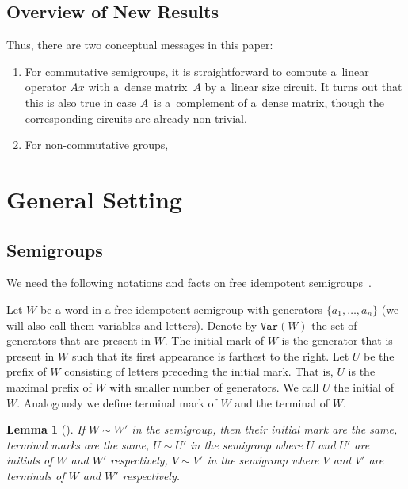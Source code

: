 \documentclass[11pt,letterpaper]{article}
\newtheorem{lemma}{Lemma}
\newcommand{\var}{\texttt{Var}}
\begin{document}
\subsection{Overview of New Results}

Thus, there are two conceptual messages in this paper:
\begin{enumerate}
\item For commutative semigroups, it is straightforward to compute a~linear operator $Ax$ with a~dense matrix~$A$ by a~linear size circuit. It turns out that this is also true in case $A$~is a~complement of a~dense matrix, though the corresponding circuits are already non-trivial.
\item For non-commutative groups,
\end{enumerate}

\section{General Setting}
\subsection{Semigroups}

We need the following notations and facts on free idempotent semigroups~\cite{GreenR52}.

Let $W$ be a word in a free idempotent semigroup with generators $\{a_1,\ldots, a_n\}$ (we will also call them variables and letters). Denote by $\var(W)$ the set of generators that are present in $W$. The initial mark of $W$ is the generator that is present in $W$ such that its first appearance is farthest to the right. Let $U$ be the prefix of $W$ consisting of letters preceding the initial mark. That is, $U$ is the maximal prefix of $W$ with smaller number of generators. We call $U$ the initial of $W$. Analogously we define terminal mark of $W$ and the terminal of $W$.

\begin{lemma}[\cite{GreenR52}] \label{lem:GR}
If $W\sim W'$ in the semigroup, then their initial mark are the same, terminal marks are the same, $U \sim U'$ in the semigroup where $U$ and $U'$ are initials of $W$ and $W'$ respectively, $V\sim V'$ in the semigroup where $V$ and $V'$ are terminals of $W$ and $W'$ respectively.
\end{lemma}
\end{document}
